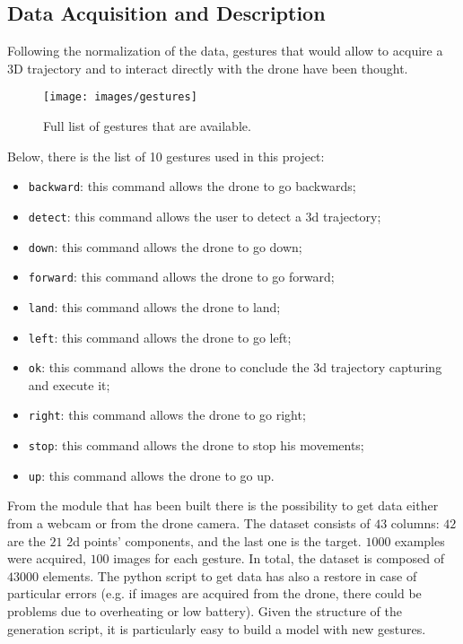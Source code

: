 \subsection{Data Acquisition and Description}
\label{sec:getdata}
Following the normalization of the data, gestures that would allow to acquire a 3D trajectory and to interact directly with the drone have been thought. \\

\begin{figure}[H]
	\centering
	\texttt{[image: images/gestures]}
	\caption[Full list of gestures.]{Full list of gestures that are available.}
	\label{fig:gestures}
\end{figure}

\noindent Below, there is the list of 10 gestures used in this project:
\begin{itemize}
	\item \texttt{backward}: this command allows the drone to go backwards;
	\item \texttt{detect}: this command allows the user to detect a \gls{3d} trajectory;
	\item \texttt{down}: this command allows the drone to go down;
	\item \texttt{forward}: this command allows the drone to go forward;
	\item \texttt{land}: this command allows the drone to land;
	\item \texttt{left}: this command allows the drone to go left;
	\item \texttt{ok}: this command allows the drone to conclude the \gls{3d} trajectory capturing and execute it;
	\item \texttt{right}: this command allows the drone to go right;
	\item \texttt{stop}: this command allows the drone to stop his movements;
	\item \texttt{up}: this command allows the drone to go up.
\end{itemize}

\noindent From the module that has been built there is the possibility to get data either from a webcam or from the drone camera. The dataset consists of $43$ columns: $42$ are the $21$ \gls{2d} points’ components, and the last one is the target. $1000$ examples were acquired, $100$ images for each gesture. In total, the dataset is composed of $43000$ elements. The python script to get data has also a restore in case of particular errors (e.g. if images are acquired from the drone, there could be problems due to overheating or low battery). Given the structure of the generation script, it is particularly easy to build a model with new gestures.

